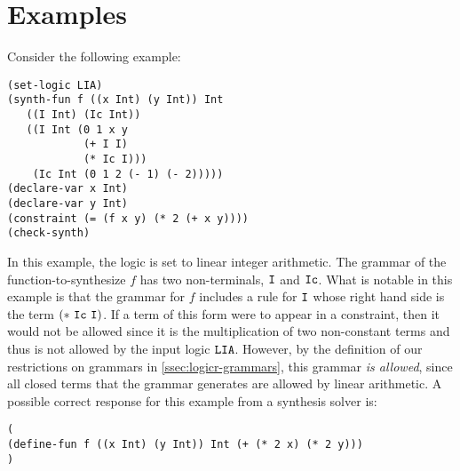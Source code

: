 \documentclass[english,a4paper,10pt]{article}
\begin{document}
\section{Examples}%
\label{sec:examples}


\begin{example}
Consider the following example:
\begin{lstlisting}[language=SyGuS]
(set-logic LIA)
(synth-fun f ((x Int) (y Int)) Int
   ((I Int) (Ic Int))
   ((I Int (0 1 x y
            (+ I I)
            (* Ic I)))
    (Ic Int (0 1 2 (- 1) (- 2)))))
(declare-var x Int)
(declare-var y Int)
(constraint (= (f x y) (* 2 (+ x y))))
(check-synth)
\end{lstlisting}
In this example, the logic is set 
to linear integer arithmetic.
The grammar of the function-to-synthesize $f$
has two non-terminals, ${\tt I}$ and ${\tt Ic}$.
What is notable in this example is that
the grammar for $f$ includes a rule for ${\tt I}$ whose right hand side 
is the term ${\tt(*\ Ic\ I)}$. 
If a term of this form were to appear
in a constraint, 
then it would not be allowed since it is the
multiplication of two non-constant terms and thus is not allowed by the input logic ${\tt LIA}$.
However, 
by the definition of our restrictions on grammars in \cref{ssec:logicr-grammars},
this grammar \emph{is allowed},
since all closed terms that the grammar generates are allowed by linear arithmetic.
A possible correct response for this example from a synthesis solver is:
\begin{lstlisting}[language=SyGuS]
(
(define-fun f ((x Int) (y Int)) Int (+ (* 2 x) (* 2 y)))
)
\end{lstlisting}
\end{example}
\end{document}

